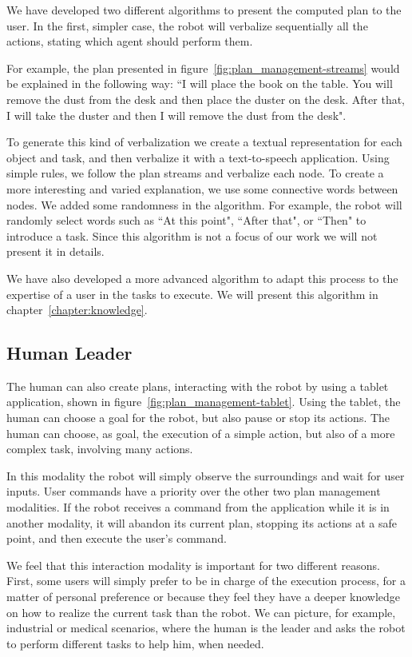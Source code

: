We have developed two different algorithms to present the computed plan to the user. In the first, simpler case, the robot will verbalize sequentially all the actions, stating which agent should perform them. 

For example, the plan presented in figure~\ref{fig:plan_management-streams} would be explained in the following way: ``I will place the book on the table. You will remove the dust from the desk and then place the duster on the desk. After that, I will take the duster and then I will remove the dust from the desk".

To generate this kind of verbalization we create a textual representation for each object and task, and then verbalize it with a text-to-speech application. Using simple rules, we follow the plan streams and verbalize each node. To create a more interesting and varied explanation, we use some connective words between nodes. We added some randomness in the algorithm. For example, the robot will randomly select words such as ``At this point", ``After that", or ``Then" to introduce a task. Since this algorithm is not a focus of our work we will not present it in details.

 We have also developed a more advanced algorithm to adapt this process to the expertise of a user in the tasks to execute. We will present this algorithm in chapter~\ref{chapter:knowledge}.

\subsection{Human Leader}
The human can also create plans, interacting with the robot by using a
tablet application, shown in figure~\ref{fig:plan_management-tablet}. Using the tablet, the human can choose a goal for the robot, but also pause or stop its actions. The human can choose, as goal,  the execution of a simple action, but also of a more complex task, involving many actions.


In this modality the robot  will simply observe the surroundings and wait for user inputs. User commands have a priority over the other two plan management modalities. If the robot receives a command from the
application while it is in another modality, it will abandon its current
plan, stopping its actions at a safe point, and then execute the user's
command. 

We feel that this interaction modality is important for two
different reasons.  First, some users will simply prefer to be in
charge of the execution process, for a matter of personal preference or because they
feel they have a deeper knowledge on how to realize the current task
than the robot. We can picture, for example, industrial or medical
scenarios, where the human is the leader and asks the robot to perform
different tasks to help him, when needed.

